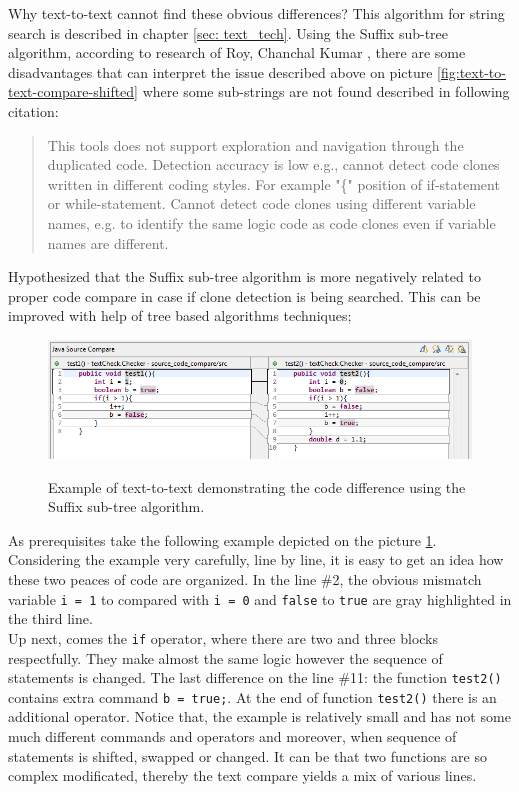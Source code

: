 \documentclass{report}
\begin{document}
Why text-to-text cannot find these obvious differences? This algorithm for string search is described in chapter \ref{sec: text_tech}. Using the Suffix sub-tree algorithm,  according to research of Roy, Chanchal Kumar \cite{software_clone_detection}, there are some disadvantages that can interpret the issue described above on picture \ref{fig:text-to-text-compare-shifted} where some sub-strings are not found described in following citation:
\begin{quote} 
This tools does not support exploration and navigation through the duplicated code. Detection accuracy is low e.g., cannot detect code clones written in different coding styles. For example "\{" position of if-statement or while-statement. Cannot detect code clones using different variable names, e.g. to identify the same logic code as code clones even if variable names are different\cite{software_clone_detection}. 
\end{quote}

Hypothesized that the Suffix sub-tree algorithm is more negatively related to proper code compare in case if clone detection is being searched. This can be improved with help of tree based algorithms techniques;
\begin{figure}[h]
  \centering
  \includegraphics[width=1.00\textwidth]{Figures/text-to-text/text-compared-for-improve}\\[0.1cm]
  \caption[Text comparison example where strings of code are replaced.]{Example of text-to-text demonstrating the code difference using the Suffix sub-tree algorithm. }
  \label{fig:text-compared-for-improve}
\end{figure}

As prerequisites take the following example depicted on the picture \ref{fig:text-compared-for-improve}. Considering the example very carefully, line by line, it is easy to get an idea how these two peaces of code are organized. In the line \#2, the obvious mismatch variable \texttt{i = 1} to compared with \texttt{i = 0} and \texttt{false} to \texttt{true} are gray highlighted in the third line.
\\
Up next, comes the \texttt{if} operator, where there are two and three blocks respectfully. They make almost the same logic however the sequence of statements is changed.
The last difference on the line \#11: the function \texttt{test2()} contains extra command \texttt{b = true;}.
At the end of function \texttt{test2()} there is an additional operator. Notice that, the example is relatively small and has not some much different commands and operators and moreover, when sequence of statements is shifted, swapped or changed. It can be that two functions are so complex modificated, thereby the text compare yields a mix of various lines. 
\end{document}
